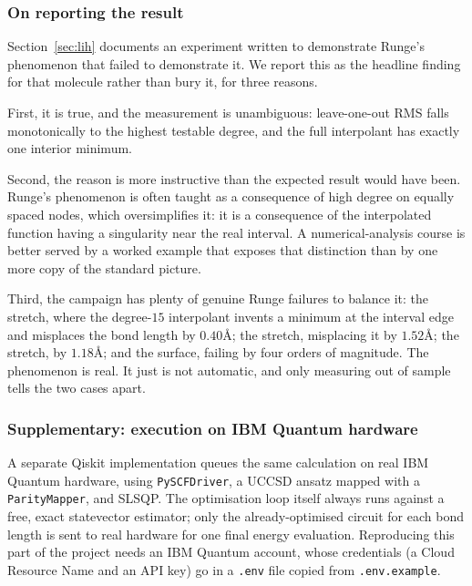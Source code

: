 \documentclass[sigconf,screen,nonacm]{acmart}
\newcommand{\Ang}{\text{\AA}}
\begin{document}
\subsubsection{On reporting the  result}

Section~\ref{sec:lih} documents an experiment written to demonstrate Runge's
phenomenon that failed to demonstrate it. We report this as the headline
finding for that molecule rather than bury it, for three reasons.

First, it is true, and the measurement is unambiguous: leave-one-out RMS
falls monotonically to the highest testable degree, and the full interpolant
has exactly one interior minimum.

Second, the reason is more instructive than the expected result would have
been. Runge's phenomenon is often taught as a consequence of high degree on
equally spaced nodes, which oversimplifies it: it is a consequence of the
interpolated function having a singularity near the real interval. A
numerical-analysis course is better served by a worked example that exposes
that distinction than by one more copy of the standard picture.

Third, the campaign has plenty of genuine Runge failures to balance it: the
 stretch, where the degree-$15$ interpolant invents a minimum at the
interval edge and misplaces the bond length by $0.40\Ang$; the 
stretch, misplacing it by $1.52\Ang$; the  stretch, by $1.18\Ang$;
and the  surface, failing by four orders of magnitude. The
phenomenon is real. It just is not automatic, and only measuring out of
sample tells the two cases apart.

\subsubsection{Supplementary: execution on IBM Quantum hardware}
\label{sec:ibm}

A separate Qiskit implementation queues the same  calculation on real
IBM Quantum hardware, using \texttt{PySCFDriver}, a UCCSD ansatz mapped with
a \texttt{ParityMapper}, and SLSQP. The optimisation loop itself always runs
against a free, exact statevector estimator; only the already-optimised
circuit for each bond length is sent to real hardware for one final energy
evaluation. Reproducing this part of the project needs an IBM Quantum
account, whose credentials (a Cloud Resource Name and an API key) go in a
\texttt{.env} file copied from \texttt{.env.example}.
\end{document}

